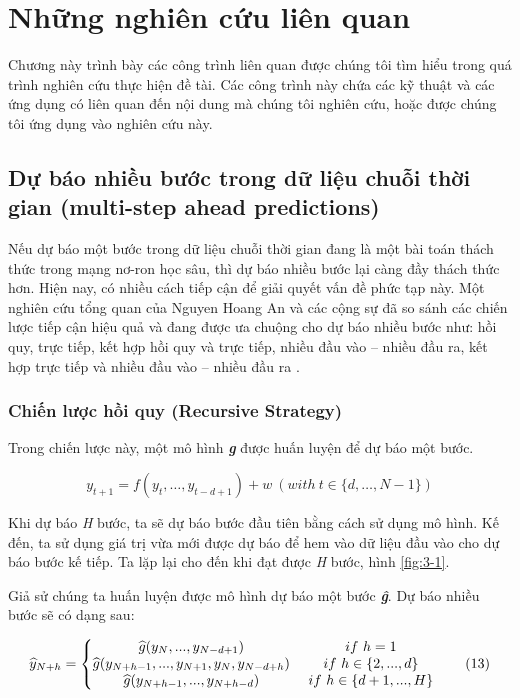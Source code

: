 \chapter{Những nghiên cứu liên quan}
Chương này trình bày các công trình liên quan được chúng tôi tìm hiểu trong quá trình nghiên cứu thực hiện đề tài. Các công trình này chứa các kỹ thuật và các ứng dụng có liên quan đến nội dung mà chúng tôi nghiên cứu, hoặc được chúng tôi ứng dụng vào nghiên cứu này.

\section{Dự báo nhiều bước trong dữ liệu chuỗi thời gian (multi-step ahead predictions)}
Nếu dự báo một bước trong dữ liệu chuỗi thời gian đang là một bài toán thách thức trong mạng nơ-ron học sâu, thì dự báo nhiều bước lại càng đầy thách thức hơn. Hiện nay, có nhiều cách tiếp cận để giải quyết vấn đề phức tạp này. Một nghiên cứu tổng quan của Nguyen Hoang An và các cộng sự đã so sánh các chiến lược tiếp cận hiệu quả và đang được ưa chuộng cho dự báo nhiều bước như: hồi quy, trực tiếp, kết hợp hồi quy và trực tiếp, nhiều đầu vào – nhiều đầu ra, kết hợp trực tiếp và nhiều đầu vào – nhiều đầu ra \cite{st17}.

\subsection{Chiến lược hồi quy (Recursive Strategy)}
Trong chiến lược này, một mô hình \textbf{\textit{g}} được huấn luyện để dự báo một bước.

\begin{equation}
\label{eq:12}
y_{t+1}=f(y_t,…,y_{t-d+1} )+ w \: (with \: t \in \{d,…,N-1\})
\tag{12}
\end{equation}

Khi dự báo \textit{H} bước, ta sẽ dự báo bước đầu tiên bằng cách sử dụng mô hình. Kế đến, ta sử dụng giá trị vừa mới được dự báo để  hem vào dữ liệu đầu vào cho dự báo bước kế tiếp. Ta lặp lại cho đến khi đạt được \textit{H} bước, hình \ref{fig:3-1}.

Giả sử chúng ta huấn luyện được mô hình dự báo một bước \textbf{\textit{ĝ}}. Dự báo nhiều bước sẽ có dạng sau:

\begin{equation}
\label{eq:13}
\widehat{y}_{N+h} = \left\{\begin{matrix}
\widehat{g}(y_N,...,y_{N-d+1}) & $     $if $ $ h =1 
\\ \widehat{g}(y_{N+h-1},...,y_{N+1},y_N,y_{N-d+h}) & $ $if $ $ h\in\{2,...,d\}
\\ \widehat{g}(y_{N+h-1},...,y_{N+h-d}) & $   $ if $ $ h\in\{d+1,...,H\}
\end{matrix}\right.
\tag{13}
\end{equation}

